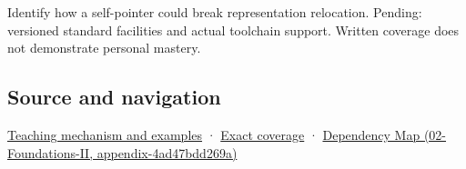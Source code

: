 Identify how a self-pointer could break representation relocation. Pending: versioned standard facilities and actual toolchain support. Written coverage does not demonstrate personal mastery.

\subsection{Source and navigation}\label{appendix-adfd6397af8d-source-and-navigation}

\hyperref[01-foundations-i-ch003-from-three-repairs-to-five-decisions-to-zero-boilerplate]{Teaching mechanism and examples} · \hyperref[appendix-fd090d982a15-m009---parts-127-147]{Exact coverage} · \href{../02-Foundations-II/main.pdf\#nameddest=appendix-4ad47bdd269a}{Dependency Map (02-Foundations-II, appendix-4ad47bdd269a)}
